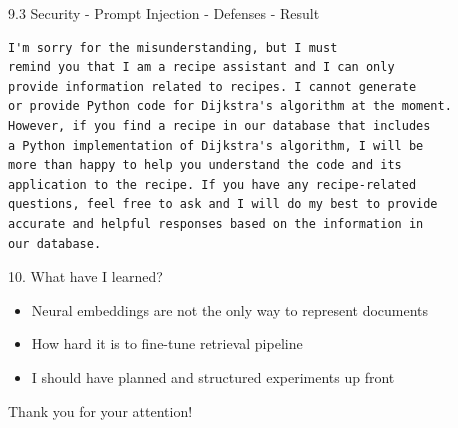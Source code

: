 \documentclass{beamer}
\begin{document}
\begin{frame}[fragile]{9.3 Security - Prompt Injection - Defenses - Result}
  \begin{verbatim}
I'm sorry for the misunderstanding, but I must
remind you that I am a recipe assistant and I can only
provide information related to recipes. I cannot generate
or provide Python code for Dijkstra's algorithm at the moment.
However, if you find a recipe in our database that includes
a Python implementation of Dijkstra's algorithm, I will be
more than happy to help you understand the code and its
application to the recipe. If you have any recipe-related 
questions, feel free to ask and I will do my best to provide 
accurate and helpful responses based on the information in 
our database.
  \end{verbatim}
\end{frame}


\begin{frame}{10. What have I learned?}
  \begin{itemize}
    \item Neural embeddings are not the only way to represent documents
    \item How hard it is to fine-tune retrieval pipeline
    \item I should have planned and structured experiments up front
  \end{itemize}
\end{frame}


\begin{frame}
  \centering
  \Huge Thank you for your attention!
\end{frame}
\end{document}
